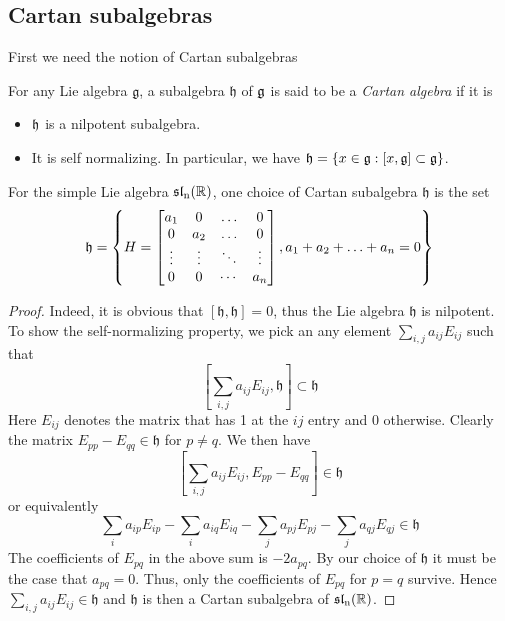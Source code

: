 \subsection{Cartan subalgebras}
First we need the notion of Cartan subalgebras
\begin{definition}
    For any Lie algebra $\mathfrak{g}$, a subalgebra $\mathfrak{h}$ of $\operatorname{\mathfrak{g}}$ is said to be a \textit{Cartan algebra} if it is
    \begin{itemize}
        \item $\operatorname{\mathfrak{h}}$ is a nilpotent subalgebra.
        \item It is self normalizing. In particular, we have $\operatorname{\mathfrak{h}} = \left\lbrace x \in \operatorname{\mathfrak{g}} : [x,\operatorname{\mathfrak{g}}] \subset \operatorname{\mathfrak{g}}\right\rbrace$.
    \end{itemize}
\end{definition}
\begin{example}
    For the simple Lie algebra $\operatorname{\mathfrak{sl}_n(\mathbb{R})}$, one choice of  Cartan subalgebra $\mathfrak{h}$ is the set
\[\operatorname{\mathfrak{h}} = \left\lbrace H= \begin{bmatrix}
        a_1    & 0      & \ldots & 0      \\
        0      & a_2    & \ldots & 0      \\
        \vdots & \vdots & \ddots & \vdots \\
        0      & 0      & \cdots & a_n
    \end{bmatrix}, a_1 + a_2+ \ldots + a_n = 0\right\rbrace\]
\end{example}
\begin{proof}
    Indeed, it is obvious that $[\mathfrak{h},\mathfrak{h}]=0$, thus the Lie algebra $\mathfrak{h}$ is nilpotent. To show the 
    self-normalizing property, we pick an any element $\sum_{i,j}a_{ij}E_{ij}$ such that
    \[\left[\sum_{i,j}a_{ij}E_{ij},\mathfrak{h}\right]\subset \mathfrak{h}\]
    Here $E_{ij}$ denotes the matrix that has 1 at the $ij$ entry and 0 otherwise. Clearly the matrix
    $E_{pp}-E_{qq} \in \mathfrak{h}$ for $p \ne q$. We then have 
    \[\left[\sum_{i,j}a_{ij}E_{ij},E_{pp}-E_{qq}\right] \in \mathfrak{h}\]
    or equivalently
    \[\sum_{i}a_{ip}E_{ip}-\sum_{i}a_{iq}E_{iq}-\sum_j a_{pj}E_{pj}-\sum_j a_{qj}E_{qj} \in \mathfrak{h}\]
    The coefficients of $E_{pq}$ in the above sum is $-2a_{pq}$. By our choice of $\mathfrak{h}$ it must be the case that $a_{pq}=0$. Thus,
    only the coefficients of $E_{pq}$ for $p=q$ survive. Hence 
    $\sum_{i,j}a_{ij}E_{ij} \in \mathfrak{h}$  and $\mathfrak{h}$ is then a Cartan subalgebra of $\operatorname{\mathfrak{sl}_n(\mathbb{R})}$.
\end{proof}
